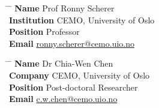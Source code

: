 \documentclass[10pt]{article} %
\begin{document}
\parbox{0.5\textwidth}{ %
\begin{tabbing}
\hspace{2.75cm} \= \hspace{4cm} \= \kill %
{\bf Name} \> Prof Ronny Scherer \\ %
{\bf Institution} \> CEMO, University of Oslo \\ %
{\bf Position} \> Professor \\ %
{\bf Email} \> \href{mailto:ronny.scherer@cemo.uio.no}{ronny.scherer@cemo.uio.no} %
\end{tabbing}}
\hfill %
\parbox{0.5\textwidth}{ %
\begin{tabbing}
\hspace{2.75cm} \= \hspace{4cm} \= \kill %
{\bf Name} \> Dr Chia-Wen Chen \\ %
{\bf Company} \> CEMO, University of Oslo \\ %
{\bf Position} \> Post-doctoral Researcher \\ %
{\bf Email} \> \href{mailto:c.w.chen@cemo.uio.no}{c.w.chen@cemo.uio.no} %
\end{tabbing}}

\end{document}
